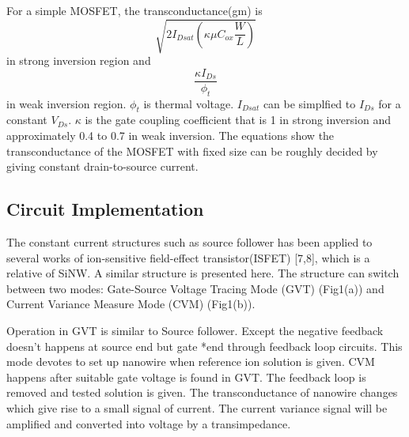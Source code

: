 \documentclass{article}
\begin{document}
For a simple MOSFET, the transconductance(gm) is
\begin{equation}
    \sqrt{2I_{Dsat} (\kappa \mu C_{ox} \frac{W}{L})}
\end{equation}
in strong inversion region and
\begin{equation}
    \frac{\kappa I_{Ds}}{\phi_t}
\end{equation}
in weak inversion region. $\phi_t$ is thermal voltage.
$I_{Dsat}$ can be simplfied to $I_{Ds}$ for a constant $V_{Ds}$.
$\kappa$ is the gate coupling coefficient that is 1 in strong inversion and approximately 0.4 to 0.7 in weak inversion.
The equations show the transconductance of the MOSFET with fixed size can be roughly decided by giving constant drain-to-source current.

\subsection{Circuit Implementation}
The constant current structures such as source follower has been applied to several works of ion-sensitive field-effect transistor(ISFET) [7,8], which is a relative of SiNW.
A similar structure is presented here. The structure can switch between two modes: Gate-Source Voltage Tracing Mode (GVT) (Fig1(a)) and Current Variance Measure Mode (CVM) (Fig1(b)).

Operation in GVT is similar to Source follower.
Except the negative feedback doesn’t happens at source end but gate *end through feedback loop circuits.
This mode devotes to set up nanowire when reference ion solution is given.
CVM happens after suitable gate voltage is found in GVT.
The feedback loop is removed and tested solution is given.
The transconductance of nanowire changes which give rise to a small signal of current.
The current variance signal will be amplified and converted into voltage by a transimpedance.

\subsection{}




%
%
%
%
\end{document}
